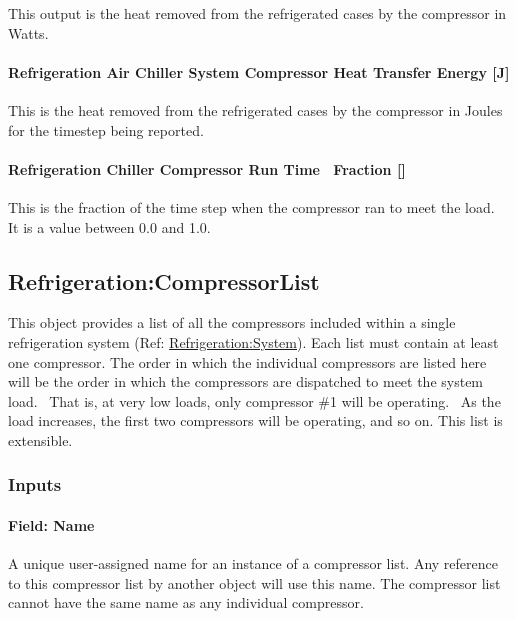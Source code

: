This output is the heat removed from the refrigerated cases by the compressor in Watts.

\paragraph{Refrigeration Air Chiller System Compressor Heat Transfer Energy {[}J{]}}\label{refrigeration-air-chiller-system-compressor-heat-transfer-energy-j}

This is the heat removed from the refrigerated cases by the compressor in Joules for the timestep being reported.

\paragraph{Refrigeration Chiller Compressor Run Time~ Fraction {[]}}\label{refrigeration-chiller-compressor-run-time-fraction}

This is the fraction of the time step when the compressor ran to meet the load.~ It is a value between 0.0 and 1.0.

\subsection{Refrigeration:CompressorList}\label{refrigerationcompressorlist}

This object provides a list of all the compressors included within a single refrigeration system (Ref: \hyperref[refrigerationsystem]{Refrigeration:System}). Each list must contain at least one compressor. The order in which the individual compressors are listed here will be the order in which the compressors are dispatched to meet the system load.~ That is, at very low loads, only compressor \#1 will be operating.~ As the load increases, the first two compressors will be operating, and so on. This list is extensible.

\subsubsection{Inputs}\label{inputs-6-020}

\paragraph{Field: Name}\label{field-name-7-016}

A unique user-assigned name for an instance of a compressor list. Any reference to this compressor list by another object will use this name. The compressor list cannot have the same name as any individual compressor.

